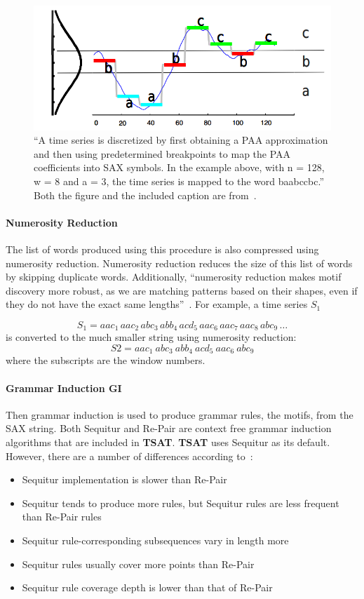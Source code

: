 \documentclass[titlepage, letterpaper, 12pt]{article}
\newcommand\TSAT{\textbf{TSAT}}
\begin{document}
\begin{figure}[H]
	\centering
	\includegraphics[width=.7\textwidth]{pictures/TSAT-SAX}
	\caption{``A time series is discretized by first obtaining a PAA approximation and then using predetermined breakpoints to map the PAA coefficients into SAX symbols. In the example above, with n = 128, w = 8 and a = 3, the time series is mapped to the word baabccbc.''  Both the figure and the included caption are from~\cite{lin2007experiencing}.}
	\label{fig:tsat-sax}
\end{figure}


\paragraph{Numerosity Reduction}The list of words produced using this procedure is also compressed using numerosity reduction.  Numerosity reduction reduces the size of this list of words by skipping duplicate words.  Additionally, ``numerosity reduction makes motif discovery more robust, as we are matching patterns based on their shapes, even if they do not have the exact same lengths''~\cite{li2012visualizing}.  For example, a time series \(S_{1}\) 

\[
S_{1}= aac_{1}\, aac_{2}\, abc_{3}\, abb_{4}\, acd_{5}\, aac_{6}\, aac_{7}\, aac_{8}\, abc_{9}\, \dots
\]
is converted to the much smaller string using numerosity reduction:
\[S2 = \textit{aac}_{1}~ \textit{abc}_{3}~ \textit{abb}_{4}~ \textit{acd}_{5}~ \textit{aac}_{6}~ \textit{abc}_{9}\]
where the subscripts are the window numbers.

\paragraph{Grammar Induction GI}Then grammar induction is used to produce grammar rules, the motifs, from the SAX string. Both Sequitur and Re-Pair are context free grammar induction algorithms that are included in {\TSAT}.  {\TSAT} uses Sequitur as its default.  However, there are a number of differences according to~\cite{readmeGI}:
\begin{itemize}
	\item Sequitur implementation is slower than Re-Pair
	\item Sequitur tends to produce more rules, but Sequitur rules are less frequent than Re-Pair rules
	\item Sequitur rule-corresponding subsequences vary in length more
	\item Sequitur rules usually cover more points than Re-Pair
	\item Sequitur rule coverage depth is lower than that of Re-Pair
\end{itemize}
\end{document}
